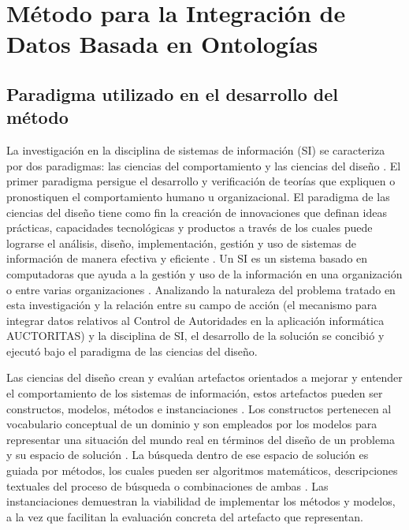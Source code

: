 \chapter{\large Método para la Integración de Datos Basada en Ontologías}


\pagestyle{fancy}
\lhead{}
\chead{}
\lfoot{}
\cfoot{}
\rfoot{\thepage}
\renewcommand{\headrulewidth}{0.4pt}
 \vspace{-1cm}

\section{Paradigma utilizado en el desarrollo del método}
La investigación en la disciplina de sistemas de información (SI) se caracteriza por dos paradigmas: las ciencias del comportamiento y las ciencias del diseño \citep{Hevner:2004:DSI:2017212.2017217}. El primer paradigma persigue el desarrollo y verificación de teorías que expliquen o pronostiquen el comportamiento humano u organizacional. El paradigma de las ciencias del diseño tiene como fin la creación de innovaciones que definan ideas prácticas, capacidades tecnológicas y productos a través de los cuales puede lograrse el análisis, diseño, implementación, gestión y uso de sistemas de información de manera efectiva y eficiente \citep{Denning:1997:NSC:253671.253755}. Un SI es un sistema basado en computadoras que ayuda a la gestión y uso de la información en una organización o entre varias organizaciones \citep{GarciaNoguera2009}. Analizando la naturaleza del problema tratado en esta investigación y la relación entre su campo de acción (el mecanismo para integrar datos relativos al Control de Autoridades en la aplicación informática AUCTORITAS) y la disciplina de SI, el desarrollo de la solución se concibió y ejecutó bajo el paradigma de las ciencias del diseño.

Las ciencias del diseño crean y evalúan artefactos orientados a mejorar y entender el comportamiento de los sistemas de información, estos artefactos pueden ser constructos, modelos, métodos e instanciaciones \citep{March:1995:DNS:1700865.1700867}. Los constructos pertenecen al vocabulario conceptual de un dominio y son empleados por los modelos para representar una situación del mundo real en términos del diseño de un problema y su espacio de solución \citep{Simon:1996:SA:237774}. La búsqueda dentro de ese espacio de solución es guiada por métodos, los cuales pueden ser algoritmos matemáticos, descripciones textuales del proceso de búsqueda o combinaciones de ambas \citep{Hevner:2004:DSI:2017212.2017217}. Las instanciaciones demuestran la viabilidad de implementar los métodos y modelos, a la vez que facilitan la evaluación concreta del artefacto que representan.

